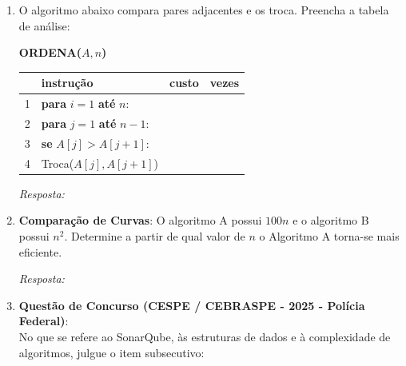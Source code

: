 \documentclass[12pt]{article}
\newcommand{\quadro}[1]{\vspace{0.2cm}\begin{tcolorbox}[colback=white, colframe=black, height=#1, boxrule=0.5pt, arc=0pt] \textit{Resposta:} \end{tcolorbox}}
\begin{document}
\begin{enumerate}[label=\arabic*), leftmargin=1.5cm, itemsep=0.8cm]
    \item O algoritmo abaixo compara pares adjacentes e os troca. Preencha a tabela de análise:
    \begin{center}
    \end{center}
    \begin{tcolorbox}[colback=white, colframe=black, fontupper=\small]
        \textbf{ORDENA($A, n$)} \\
        \begin{tabular}{llcc}
            \hline
            & \textbf{instrução} & \textbf{custo} & \textbf{vezes} \\
            \hline
            1 & \textbf{para} $i = 1$ \textbf{até} $n$: & \underline{\hspace{1cm}} & \underline{\hspace{1cm}} \\
            2 & \quad \textbf{para} $j = 1$ \textbf{até} $n - 1$: & \underline{\hspace{1cm}} & \underline{\hspace{1cm}} \\
            3 & \quad \quad \textbf{se} $A[j] > A[j+1]$: & \underline{\hspace{1cm}} & \underline{\hspace{1cm}} \\
            4 & \quad \quad \quad Troca($A[j], A[j+1]$) & \underline{\hspace{1cm}} & \underline{\hspace{1cm}} \\
            \hline
        \end{tabular}
    \end{tcolorbox}
    \quadro{2cm}


    \item \textbf{Comparação de Curvas}: O algoritmo A possui $100n$ e o algoritmo B possui $n^2$. Determine a partir de qual valor de $n$ o Algoritmo A torna-se mais eficiente.
    \quadro{4cm}

    \item \textbf{Questão de Concurso (CESPE / CEBRASPE - 2025 - Polícia Federal)}: \\
    No que se refere ao SonarQube, às estruturas de dados e à complexidade de algoritmos, julgue o item subsecutivo:
    

\end{enumerate}
\end{document}
